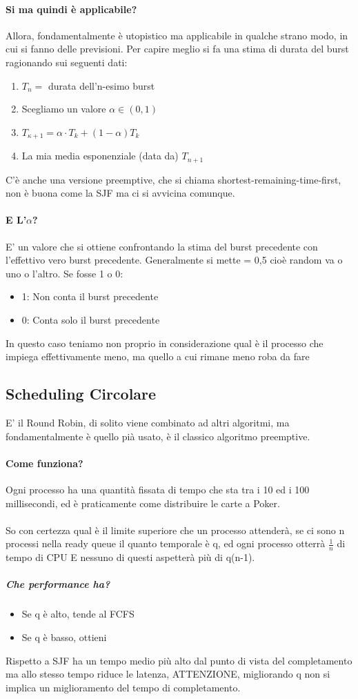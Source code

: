 \documentclass[12pt, a4paper, openany, twoside]{book}
\begin{document}
\paragraph{Si ma quindi è applicabile?} Allora, fondamentalmente è utopistico ma
applicabile in qualche strano modo, in cui si fanno delle previsioni. Per capire
meglio si fa una stima di durata del burst ragionando sui seguenti dati:
\begin{enumerate}
	\item $T_{n} = $ durata dell'n-esimo burst
	\item Scegliamo un valore $\alpha\in (0,1)$
	\item $T_{\kappa + 1} = \alpha\cdot T_{k} + (1- \alpha)T_{k}$
	\item La mia media esponenziale (data da) $T_{n+1}$
\end{enumerate}
C'è anche una versione preemptive, che si chiama shortest-remaining-time-first,
non è buona come la SJF ma ci si avvicina comunque.
\paragraph{E L'$\alpha$?}
E' un valore che si ottiene confrontando la stima del burst precedente con 
l'effettivo vero burst precedente. Generalmente si mette = 0,5 cioè random
va o uno o l'altro. Se fosse 1 o 0:
\begin{itemize}
	\item 1: Non conta il burst precedente
	\item 0: Conta solo il burst precedente %
\end{itemize}
In questo caso teniamo non proprio in considerazione qual è il processo che 
impiega effettivamente meno, ma quello a cui rimane meno roba da fare
\subsection{Scheduling Circolare}
E' il Round Robin, di solito viene combinato ad altri algoritmi, ma fondamentalmente
è quello pià usato, è il classico algoritmo preemptive.
\paragraph{Come funziona? }Ogni processo ha una quantità fissata di tempo che 
sta tra i 10 ed i 100 millisecondi, ed è praticamente come distribuire le
carte a Poker. \\ \\
So con certezza qual è il limite superiore che un processo attenderà, se ci sono
n processi nella ready queue il quanto temporale è q, ed ogni processo
otterrà $\frac{1}{n} $ di tempo di CPU E nessuno di questi aspetterà più di
q(n-1). 
\subparagraph{Che performance ha?}
\begin{itemize}
	\item Se q è alto, tende al FCFS
	\item Se q è basso, ottieni 
\end{itemize}	
Rispetto a SJF ha un tempo medio più alto dal punto di vista del completamento 
ma allo stesso tempo riduce le latenza, ATTENZIONE, migliorando q non si 
implica un miglioramento del tempo di completamento.
\end{document}
